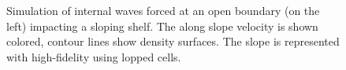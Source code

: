 \begin{figure}
\caption{Simulation of internal waves forced at an open boundary (on the left)
impacting a sloping shelf. The along slope velocity is shown colored, contour
lines show density surfaces. The slope is represented with high-fidelity using
lopped cells.}
\label{fig:boundary-forced-wave}
\end{figure}
